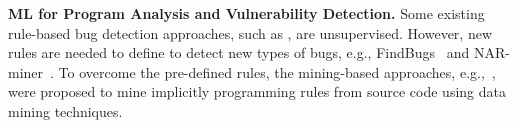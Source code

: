 


\textbf{ML for Program Analysis and Vulnerability Detection.}
Some existing rule-based bug detection approaches,
such as
\cite{Bian-2018,Jin-2012,Olivo-2015,Engler-2001,Cole-2006,Toman-2017},
are unsupervised. However, new rules are needed to
define to detect new types of bugs, e.g., FindBugs~\cite{Hovemeyer-2007} and NAR-miner~\cite{Bian-2018}.
%
To overcome the pre-defined rules, the mining-based approaches, e.g.,~\cite{Bian-2018,Jin-2012,Olivo-2015,Engler-2001,Cole-2006,Toman-2017,Li-2005}, were proposed to mine implicitly programming rules from source code using data mining techniques. 
